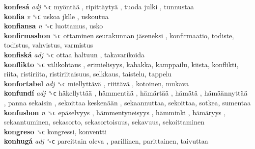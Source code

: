 \textbf{konfesá} \emph{adj}  ␝ϲ   myöntää ,  ripittäytyä ,  tuoda julki , tunnustaa  \\
\textbf{konfia} \emph{v}  ␝ϲ   uskoa jklle , uskoutua  \\
\textbf{konfiansa} \emph{n}  ␝ϲ  luottamus, usko  \\
\textbf{konfirmashon} ␝ϲ   ottaminen seurakunnan jäseneksi , konfirmaatio, todiste, todistus, vahvistus, varmistus  \\
\textbf{konfiská} \emph{adj}  ␝ϲ   ottaa haltuun , takavarikoida  \\
\textbf{konflikto} ␝ϲ   välikohtaus , erimielisyys, kahakka, kamppailu, kiista, konflikti, riita, ristiriita, ristiriitaisuus, selkkaus, taistelu, tappelu  \\
\textbf{konfortabel} \emph{adj}  ␝ϲ   miellyttävä ,  riittävä , kotoinen, mukava  \\
\textbf{konfundí} \emph{adj}  ␝ϲ   häkellyttää ,  hämmentää ,  hämärtää ,  hämätä ,  hämäännyttää ,  panna sekaisin ,  sekoittaa keskenään , sekaannuttaa, sekoittaa, sotkea, sumentaa  \\
\textbf{konfushon} \emph{n}  ␝ϲ   epäselvyys ,  hämmentyneisyys ,  hämminki ,  hämäryys , sekaantuminen, sekasorto, sekasortoisuus, sekavuus, sekoittaminen  \\
\textbf{kongreso} ␝ϲ  kongressi, konventti  \\
\textbf{konhugá} \emph{adj}  ␝ϲ   pareittain oleva , parillinen, parittainen, taivuttaa  \\
